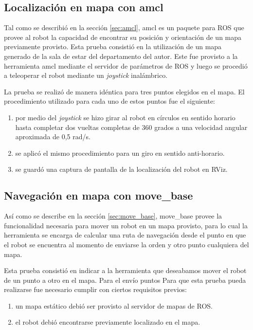 
\subsection{Localización en mapa con amcl}

Tal como se describió en la sección \ref{sec:amcl}, amcl es un paquete para ROS que provee al robot la capacidad de encontrar su posición y orientación de un mapa previamente provisto. Esta prueba consistió en la utilización de un mapa generado de la sala de estar del departamento del autor. Este fue provisto a la herramienta amcl mediante el servidor de parámetros de ROS y luego se procedió a teleoperar el robot mediante un \textit{joystick} inalámbrico.

La prueba se realizó de manera idéntica para tres puntos elegidos en el mapa. El procedimiento utilizado para cada uno de estos puntos fue el siguiente:

\begin{enumerate}
    \item por medio del \textit{joystick} se hizo girar al robot en círculos en sentido horario hasta completar dos vueltas completas de 360 grados a una velocidad angular aproximada de 0,5 rad/s.
    \item se aplicó el mismo procedimiento para un giro en sentido anti-horario.
    \item se guardó una captura de pantalla de la localización del robot en RViz.
\end{enumerate}



\subsection{Navegación en mapa con move\_base}

Así como se describe en la sección \ref{sec:move_base}, move\_base provee la funcionalidad necesaria para mover un robot en un mapa provisto, para lo cual la herramienta se encarga de calcular una ruta de navegación desde el punto en que el robot se encuentra al momento de enviarse la orden y otro punto cualquiera del mapa.

Esta prueba consistió en indicar a la herramienta que deseabamos mover el robot de un punto a otro en el mapa. Para el envío puntos  
Para que esta prueba pueda realizarse fue necesario cumplir con ciertos requisitos previos:

\begin{enumerate}
    \item un mapa estático debió ser provisto al servidor de mapas de ROS.
    \item el robot debió encontrarse previamente localizado en el mapa.
\end{enumerate}

